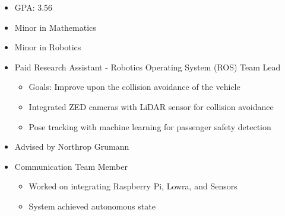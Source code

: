 \documentclass[10pt,a4paper,ragged2e,withhyper]{altacv}
\begin{document}
\begin{paracol}{2}
            \begin{itemize}
                \item GPA: 3.56
                \item Minor in Mathematics
                \item Minor in Robotics
            \end{itemize}
        
        
            \begin{itemize}
                \item Paid Research Assistant - Robotics Operating System (ROS) Team Lead
                	\begin{itemize}
               			 \item Goals: Improve upon the collision avoidance of the vehicle
                              \item Integrated ZED cameras with LiDAR sensor for collision avoidance
                              \item Pose tracking with machine learning for passenger safety detection
            		\end{itemize}
            \end{itemize}
            \divider
            
            \begin{itemize}
                \item Advised by Northrop Grumann
                \item Communication Team Member
                	\begin{itemize}
                		\item Worked on integrating Raspberry Pi, Lowra, and Sensors
               			 \item System achieved autonomous state
            		\end{itemize}
            \end{itemize}
                                    

\end{paracol}
\end{document}
